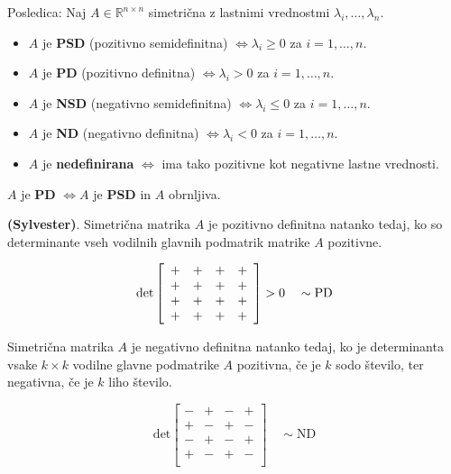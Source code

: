 \documentclass{article}
\begin{document}
\begin{multicols}{2}
	Posledica: Naj \( A \in \mathbb{R}^{n \times n} \) simetrična z lastnimi vrednostmi \( \lambda_i, \ldots, \lambda_n \).
	\begin{itemize}
		\item \( A \) je \textbf{PSD} (pozitivno semidefinitna) \( \Leftrightarrow \lambda_i \geq 0 \) za \( i=1,\ldots,n \).
		\item \( A \) je \textbf{PD} (pozitivno definitna) \( \Leftrightarrow \lambda_i > 0 \) za \( i=1,\ldots,n \).
		\item \( A \) je \textbf{NSD} (negativno semidefinitna) \( \Leftrightarrow \lambda_i \leq 0 \) za \( i=1,\ldots,n \).
		\item \( A \) je \textbf{ND} (negativno definitna) \( \Leftrightarrow \lambda_i < 0 \) za \( i=1,\ldots,n \).
		\item \( A \) je \textbf{nedefinirana} \( \Leftrightarrow \) ima tako pozitivne kot negativne lastne vrednosti.
	\end{itemize}
	\( A \) je \textbf{PD} \( \Leftrightarrow A \) je \textbf{PSD} in \( A \) obrnljiva.

	\textbf{(Sylvester)}. Simetrična matrika \( A \) je pozitivno definitna natanko tedaj, ko so determinante vseh vodilnih glavnih podmatrik matrike \( A \) pozitivne.

	\[
		\text{det} \left[
			\begin{array}{cccc}
				+ & + & + & + \\
				+ & + & + & + \\
				+ & + & + & + \\
				+ & + & + & + \\
			\end{array}
			\right] > 0 \quad \sim \text{PD} \\
	\]

	Simetrična matrika \( A \) je negativno definitna natanko tedaj, ko je determinanta vsake \( k \times k \) vodilne glavne podmatrike \( A \) pozitivna, če je \( k \) sodo število, ter negativna, če je \( k \) liho število.

	\[
		\text{det} \left[
			\begin{array}{cccc}
				- & + & - & + \\
				+ & - & + & - \\
				- & + & - & + \\
				+ & - & + & - \\
			\end{array}
			\right] \quad \sim \text{ND}
	\]


\end{multicols}
\end{document}
